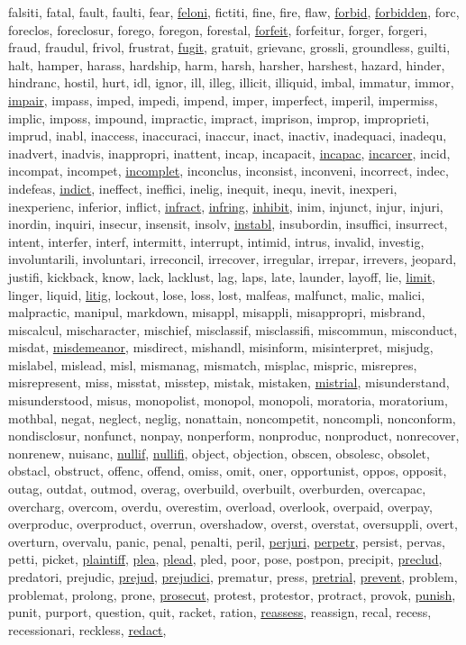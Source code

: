 falsiti, fatal, fault, faulti, fear, \underline{feloni}, fictiti, fine, fire, flaw, \underline{forbid}, \underline{forbidden}, forc, foreclos, foreclosur, forego, foregon, forestal, \underline{forfeit}, forfeitur, forger, forgeri, fraud, fraudul, frivol, frustrat, \underline{fugit}, gratuit, grievanc, grossli, groundless, guilti, halt, hamper, harass, hardship, harm, harsh, harsher, harshest, hazard, hinder, hindranc, hostil, hurt, idl, ignor, ill, illeg, illicit, illiquid, imbal, immatur, immor, \underline{impair}, impass, imped, impedi, impend, imper, imperfect, imperil, impermiss, implic, imposs, impound, impractic, impract, imprison, improp, improprieti, imprud, inabl, inaccess, inaccuraci, inaccur, inact, inactiv, inadequaci, inadequ, inadvert, inadvis, inappropri, inattent, incap, incapacit, \underline{incapac}, \underline{incarcer}, incid, incompat, incompet, \underline{incomplet}, inconclus, inconsist, inconveni, incorrect, indec, indefeas, \underline{indict}, ineffect, ineffici, inelig, inequit, inequ, inevit, inexperi, inexperienc, inferior, inflict, \underline{infract}, \underline{infring}, \underline{inhibit}, inim, injunct, injur, injuri, inordin, inquiri, insecur, insensit, insolv, \underline{instabl}, insubordin, insuffici, insurrect, intent, interfer, interf, intermitt, interrupt, intimid, intrus, invalid, investig, involuntarili, involuntari, irreconcil, irrecover, irregular, irrepar, irrevers, jeopard, justifi, kickback, know, lack, lacklust, lag, laps, late, launder, layoff, lie, \underline{limit}, linger, liquid, \underline{litig}, lockout, lose, loss, lost, malfeas, malfunct, malic, malici, malpractic, manipul, markdown, misappl, misappli, misappropri, misbrand, miscalcul, mischaracter, mischief, misclassif, misclassifi, miscommun, misconduct, misdat, \underline{misdemeanor}, misdirect, mishandl, misinform, misinterpret, misjudg, mislabel, mislead, misl, mismanag, mismatch, misplac, mispric, misrepres, misrepresent, miss, misstat, misstep, mistak, mistaken, \underline{mistrial}, misunderstand, misunderstood, misus, monopolist, monopol, monopoli, moratoria, moratorium, mothbal, negat, neglect, neglig, nonattain, noncompetit, noncompli, nonconform, nondisclosur, nonfunct, nonpay, nonperform, nonproduc, nonproduct, nonrecover, nonrenew, nuisanc, \underline{nullif}, \underline{nullifi}, object, objection, obscen, obsolesc, obsolet, obstacl, obstruct, offenc, offend, omiss, omit, oner, opportunist, oppos, opposit, outag, outdat, outmod, overag, overbuild, overbuilt, overburden, overcapac, overcharg, overcom, overdu, overestim, overload, overlook, overpaid, overpay, overproduc, overproduct, overrun, overshadow, overst, overstat, oversuppli, overt, overturn, overvalu, panic, penal, penalti, peril, \underline{perjuri}, \underline{perpetr}, persist, pervas, petti, picket, \underline{plaintiff}, \underline{plea}, \underline{plead}, pled, poor, pose, postpon, precipit, \underline{preclud}, predatori, prejudic, \underline{prejud}, \underline{prejudici}, prematur, press, \underline{pretrial}, \underline{prevent}, problem, problemat, prolong, prone, \underline{prosecut}, protest, protestor, protract, provok, \underline{punish}, punit, purport, question, quit, racket, ration, \underline{reassess}, reassign, recal, recess, recessionari, reckless, \underline{redact}, 